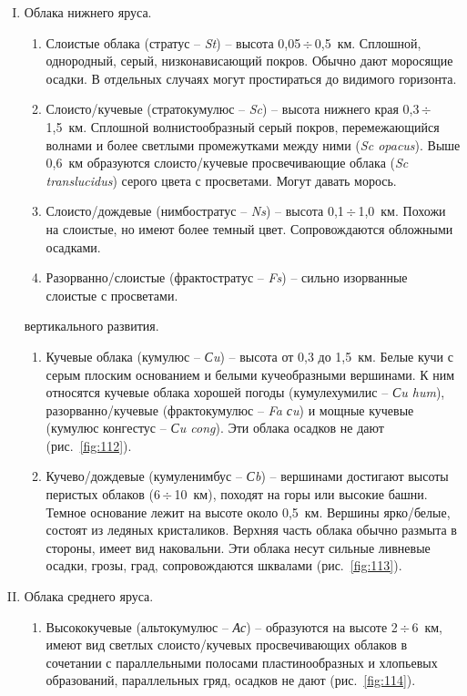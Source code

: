 \documentclass[a4paper, 12pt, twoside, final, book, russian, fittopage, cyremdash]{ncc}
\newcommand{\otdo}{\,\ensuremath{\div}\,}
\newcommand{\ris}[1]{\ref{fig:#1}}
\begin{document}
\begin{enumerate}[I.]
\item Облака нижнего яруса.
  \begin{enumerate}[1)]
  \item Слоистые облака (стратус \--- \textit{St}) \--- высота 0,05\otdo 0,5~км. Сплошной, однородный, серый, низконависающий покров. Обычно дают моросящие осадки. В отдельных случаях могут простираться до видимого горизонта.
  \item Слоисто\-/кучевые (стратокумулюс \--- \textit{Sc}) \--- высота нижнего края 0,3\otdo 1,5~км. Сплошной волнистообразный серый покров, перемежающийся волнами и более светлыми промежутками между ними (\textit{Sc opacus}). Выше 0,6~км образуются слоисто\-/кучевые просвечивающие облака (\textit{Sc translucidus}) серого цвета с просветами. Могут давать морось.
  \item Слоисто\-/дождевые (нимбостратус \--- \textit{Ns}) \--- высота 0,1\otdo 1,0~км. Похожи на слоистые, но имеют более темный цвет. Сопровождаются обложными осадками.
  \item Разорванно\-/слоистые (фрактостратус \--- \textit{Fs}) \--- сильно изорванные слоистые с просветами.
  \end{enumerate}
 вертикального развития.
  \begin{enumerate}[1)]
  \item Кучевые облака (кумулюс \--- \textit{Сu}) \--- высота от 0,3 до 1,5~км. Белые кучи с серым плоским основанием и белыми кучеобразными вершинами. К ним относятся кучевые облака хорошей погоды (кумулехумилис \--- \textit{Сu hum}), разорванно\-/кучевые (фрактокумулюс \--- \textit{Fa сu}) и мощные кучевые (кумулюс конгестус \--- \textit{Сu cong}). Эти облака осадков не дают (рис.~\ris{112}).
  \item Кучево\-/дождевые (кумуленимбус \--- \textit{Сb}) \--- вершинами достигают высоты перистых облаков (6\otdo 10~км), походят на горы или высокие башни. Темное основание лежит на высоте около 0,5~км. Вершины ярко\-/белые, состоят из ледяных кристаликов. Верхняя часть облака обычно размыта в стороны, имеет вид наковальни. Эти облака несут сильные ливневые осадки, грозы, град, сопровождаются шквалами (рис.~\ris{113}).
  \end{enumerate}
\item Облака среднего яруса.
  \begin{enumerate}[1)]
  \item Высококучевые (альтокумулюс \--- \textit{Ас}) \--- образуются на высоте 2\otdo 6~км, имеют вид светлых слоисто\-/кучевых просвечивающих облаков в сочетании с параллельными полосами пластинообразных и хлопьевых образований, параллельных гряд, осадков не дают (рис.~\ris{114}).

\end{enumerate}
\end{enumerate}
\end{document}
